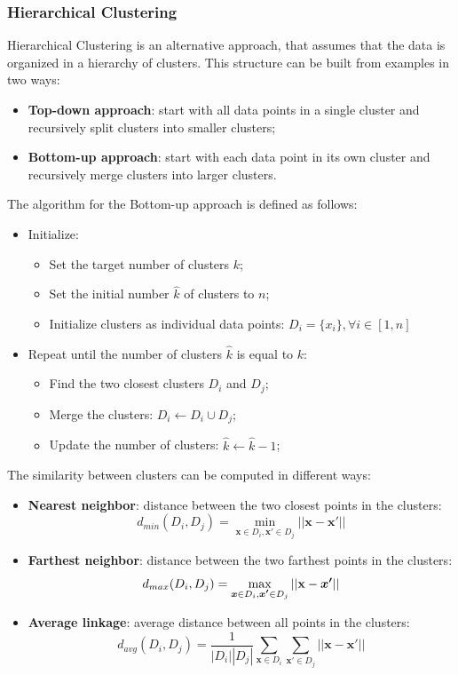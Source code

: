 \subsubsection{Hierarchical Clustering}
Hierarchical Clustering is an alternative approach, that assumes that the data is organized in a hierarchy of clusters.
This structure can be built from examples in two ways:
\begin{itemize}
    \item \textbf{Top-down approach}: start with all data points in a single cluster and recursively split clusters into smaller clusters;
    \item \textbf{Bottom-up approach}: start with each data point in its own cluster and recursively merge clusters into larger clusters.
\end{itemize}
The algorithm for the Bottom-up approach is defined as follows:
\begin{itemize}
    \item Initialize:
    \begin{itemize}
        \item Set the target number of clusters $k$;
        \item Set the initial number $\hat{k}$ of clusters to $n$;
        \item Initialize clusters as individual data points: $D_i = \{x_i\}, \forall i \in [1, n]$
    \end{itemize}
    \item Repeat until the number of clusters $\hat{k}$ is equal to $k$:
    \begin{itemize}
        \item Find the two closest clusters $D_i$ and $D_j$;
        \item Merge the clusters: $D_i \leftarrow D_i \cup D_j$;
        \item Update the number of clusters: $\hat{k} \leftarrow \hat{k} - 1$;
    \end{itemize}
\end{itemize}
The similarity between clusters can be computed in different ways:
\begin{itemize}
    \item \textbf{Nearest neighbor}: distance between the two closest points in the clusters:
    \[ d_{min}(D_i, D_j) = \min_{\boldsymbol{x} \in D_i, \boldsymbol{x'} \in D_j} ||\boldsymbol{x} - \boldsymbol{x'}|| \]
    \item \textbf{Farthest neighbor}: distance between the two farthest points in the clusters:
    \[ d_{max}(D_i, D_j) = \max_{\boldsymbol{x} \in D_i, \boldsymbol{x'} \in D_j} ||\bold{x} - \boldsymbol{x'}|| \]
    \item \textbf{Average linkage}: average distance between all points in the clusters:
    \[ d_{avg}(D_i, D_j) = \frac{1}{|D_i| |D_j|} \sum_{\boldsymbol{x} \in D_i} \sum_{\boldsymbol{x'} \in D_j} ||\boldsymbol{x} - \boldsymbol{x'}|| \]
\end{itemize}
